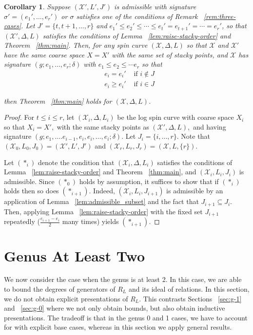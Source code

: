 \documentclass{amsart}
\theoremstyle{plain}
\newtheorem{cor}[thm]{Corollary}
\theoremstyle{definition}
\theoremstyle{remark}
\numberwithin{equation}{section}
\newcommand\sx{\mathscr X}
\newcommand{\halfcan}{L}
\begin{document}
\begin{cor}
\label{cor:raise-stacky-order}
Suppose $(\sx', \halfcan',J')$ is admissible with signature $\sigma' = (e_1
', \ldots,e_r')$ or $\sigma$ satisfies one of the conditions of
Remark ~\ref{rem:three-cases}. Let $J' = \{t,t+1, \ldots,r\}$ and
$e_1' \leq e_2' \leq \cdots \leq e_t' = e_{t+1}' =\cdots = e_r'$,
so that $(\sx', \Delta, L)$ satisfies the conditions of Lemma
~\ref{lem:raise-stacky-order} and Theorem ~\ref{thm:main}. Then,
for any spin curve $(\sx, \Delta, L)$ so that $\sx$ and $\sx'$ have
the same coarse space $X = X'$ with the same set of stacky points,
and $  \sx$ has signature $(g; e_1, \ldots, e_r; \delta)$ with $e_1
\leq e_2 \leq \cdots e_r$ so that
\begin{align*}
	& e_i	= e_i' &\text{ if }i \notin J \\
	& e_i \ge e_i' &\text{ if } i \in J
\end{align*}

\noindent
then Theorem ~\ref{thm:main} holds for $(\sx, \Delta, \halfcan)$.
\end{cor}

\begin{proof}
For $t \leq i \leq r$, let $(\sx_i, \Delta, \halfcan_i)$ be the log spin curve with coarse space $X_i$ so that $X_i = X',$ with the same stacky points as $(\sx', \Delta, \halfcan),$ and having signature $(g; e_1, \ldots. e_{i - 1}, e_i, e_i, \ldots, e_i; \delta).$ Let 
$J_i = \{i, \ldots, r\}.$ Note that $(\sx_0, \halfcan_0,J_0) = (\sx', \halfcan',J')$ and $(\sx_r , \halfcan_r ,J_r) = (\sx, L, \{r\})$.

Let $(*_i)$ denote the condition that $(\sx_i, \Delta, L_i)$
satisfies the conditions of Lemma ~\ref{lem:raise-stacky-order} and
Theorem ~\ref{thm:main}, and $(\sx_i, \halfcan_i, J_i)$ is
admissible. Since $(*_0)$ holds by assumption, it suffices to show
that if $(*_i)$ holds then so does $(*_{i + 1})$. Indeed, $(\sx_i,
\halfcan_i, J_{i + 1})$ is admissible by an application of Lemma
~\ref{lem:admissible_subset} and the fact that $J_{i + 1} \subseteq J
_i$. Then, applying Lemma ~\ref{lem:raise-stacky-order} with the
fixed set $J_{i + 1}$ repeatedly ($\frac{e_{i + 1} - e_i}{2}$ many
times) yields $(*_{i + 1})$.
\end{proof}



\section{Genus At Least Two}
\label{sec:g-high}
We now consider the case when the genus is at least 2. In this case, we are able to bound the degrees of generators of $R_\halfcan$ and its ideal of relations. In this section, we do not obtain explicit presentations of $R_\halfcan.$  This contrasts Sections ~\ref{sec:g-1} and ~\ref{sec:g-0} where we not only obtain bounds, but also obtain inductive presentations. The tradeoff is that in the genus 0 and 1 cases, we have to account for with explicit base cases, whereas in this section we apply general results.
\end{document}
